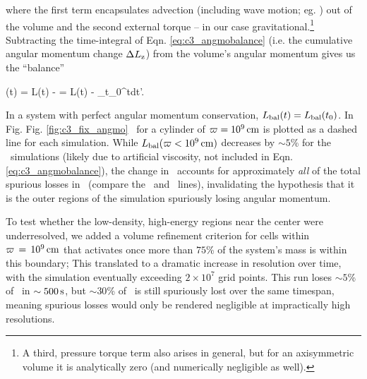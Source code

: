 \noindent where the first term encapsulates advection (including wave motion; eg. \citealt{balb03}) out of the volume and the second external torque -- in our case gravitational.\footnote{A third, pressure torque term also arises in general, but for an axisymmetric volume it is analytically zero (and numerically negligible as well).}  Subtracting the time-integral of Eqn. \ref{eq:c3_angmobalance} (i.e. the cumulative angular momentum change $\Delta \Lz$) from the volume's angular momentum gives us the ``balance''

\eqbegin
\Lbal(t) = L(t) - \Delta \Lz = L(t) - \int_{t_0}^{t}dt'.
\eqend

\noindent In a system with perfect angular momentum conservation, $\Lbal(t) = \Lbal(t_0)$.  In Fig. Fig. \ref{fig:c3_fix_angmo} \Lbal\ for a cylinder of $\varpi = 10^9\,\mathrm{cm}$ is plotted as a dashed line for each simulation.  While $\Lbal(\winnercyl)$ decreases by $\sim5$\% for the \gasoline\ simulations (likely due to artificial viscosity, not included in Eqn. \ref{eq:c3_angmobalance}), the change in \Lbal\ accounts for approximately \textit{all} of the total spurious losses in \arepo\ (compare the \Lztot\ and \Lbal\ lines), invalidating the hypothesis that it is the outer regions of the simulation spuriously losing angular momentum.  


To test whether the low-density, high-energy regions near the center were underresolved, we added a volume refinement criterion for cells within $\varpi\,=\,10^9\,\mathrm{cm}$ that activates once more than $75$\% of the system's mass is within this boundary; This translated to a dramatic increase in resolution over time, with the simulation eventually exceeding $2\times10^7$ grid points.  This run loses $\sim5$\% of \Lztot\ in $\sim500\,\mathrm{s}$, but $\sim30$\% of \Lzinner\ is still spuriously lost over the same timespan, meaning spurious losses would only be rendered negligible at impractically high resolutions.


